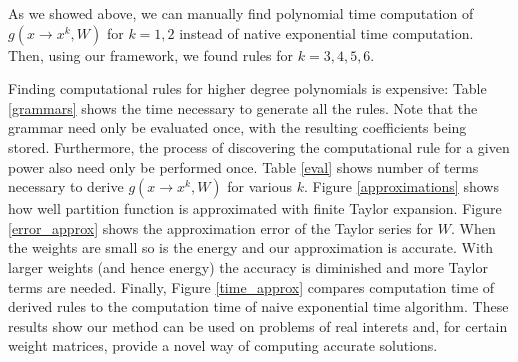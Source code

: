 As we showed above, we can manually find
polynomial time computation of $g(x \rightarrow x^k, W)$ for $k = 1, 2$
instead of native exponential time computation. Then, using our
framework, we found rules for $k = 3, 4, 5, 6$.  


Finding computational rules for higher degree
polynomials is expensive: Table \ref{grammars} shows the time
necessary to generate all the rules. Note that the grammar
need only be evaluated once, with the resulting coefficients being
stored. Furthermore, the process of discovering the computational rule
for a given power also need only be performed once. 
Table \ref{eval} shows number of terms necessary to derive $g(x
\rightarrow x^k, W)$ for various $k$. Figure \ref{approximations}
shows how well partition function is approximated with finite Taylor
expansion. Figure \ref{error_approx} shows the approximation error of
the Taylor series for $W$. When the weights are small so is the energy
and our approximation is accurate. With larger weights (and hence
energy) the accuracy is diminished and more Taylor terms are needed. Finally,
Figure \ref{time_approx} compares computation time of derived rules to
the computation time of naive exponential time algorithm.
These results show our method can be used on problems of real interets
and, for certain weight matrices, provide a novel way of computing accurate solutions. 


